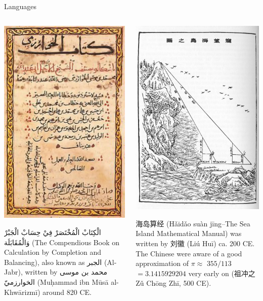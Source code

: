 \documentclass[,aspectratio=43]{beamer}
\begin{document}
\begin{frame}{Languages}
\protect\hypertarget{languages}{}
\vspace{-2em}

\begin{columns}[T]
\begin{column}{0.48\textwidth}
\begin{center}\includegraphics[width=0.4\linewidth]{figure/00-aljabr} \end{center}

\textarabic{
الْكِتَابْ الْمُخْتَصَرْ فِيْ حِسَابْ الْجَبْرْ وَالْمُقَابَلَة
} (The Compendious Book on Calculation by Completion and Balancing),
also known as \textarabic{الجبر} (Al-Jabr), written by \textarabic{
محمد بن موسى الخوارزميّ
} (Muḥammad ibn Mūsā al-Khwārizmī) around 820 CE.
\end{column}

\begin{column}{0.48\textwidth}
\begin{center}\includegraphics[width=0.4\linewidth]{figure/00-haidaosuanjing} \end{center}

海岛算经 (Hǎidǎo suàn jīng--The Sea Island Mathematical Manual) was
written by 刘徽 (Liú Huī) ca. 200 CE. The Chinese were aware of a good
approximation of \(\pi\approx\) \(355/113\) \(= 3.1415929204\) very
early on (祖冲之 Zǔ Chōng Zhī, 500 CE).
\end{column}
\end{columns}
\end{frame}
\end{document}
